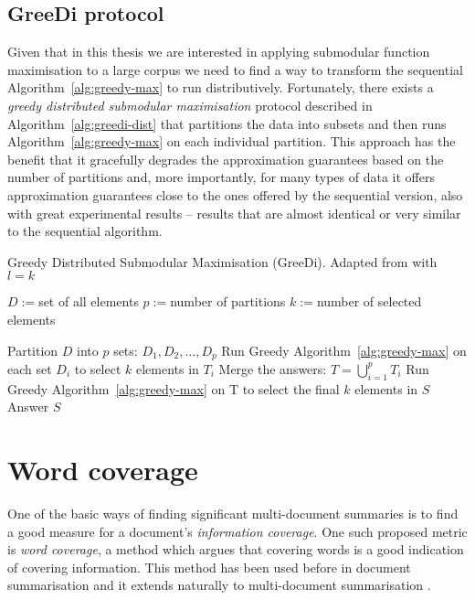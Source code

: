 \subsection{GreeDi protocol}
Given that in this thesis we are interested in applying submodular function
maximisation to a large corpus we need to find a way to transform the
sequential Algorithm~\ref{alg:greedy-max} to run distributively. Fortunately,
there exists a \emph{greedy distributed submodular maximisation} protocol
described in Algorithm~\ref{alg:greedi-dist} that partitions the data into
subsets and then runs Algorithm~\ref{alg:greedy-max} on each individual
partition. This approach has the benefit that it gracefully degrades the
approximation guarantees based on the number of partitions and, more
importantly, for many types of data it offers approximation guarantees close to
the ones offered by the sequential version, also with great experimental
results \cite{mirzasoleiman2013distributed} -- results that are almost identical or very
similar to the sequential algorithm.
\begin{algorithm}
  \caption{Greedy Distributed Submodular Maximisation (GreeDi).
      Adapted from \cite{mirzasoleiman2013distributed} with \(l = k\)}
  \label{alg:greedi-dist}
  \begin{algorithmic}
    \STATE \(D := \)set of all elements
    \STATE \(p := \)number of partitions
    \STATE \(k := \)number of selected elements
  \end{algorithmic}
  \begin{algorithmic}[1]
    \STATE Partition \(D\) into \(p\) sets: \(D_1, D_2, \ldots, D_p\)
    \STATE Run Greedy Algorithm~\ref{alg:greedy-max} on each set \(D_i\) to
        select \(k\) elements in \(T_i\)
    \STATE Merge the answers: \(T = \bigcup_{i=1}^p T_i\)
    \STATE Run Greedy Algorithm~\ref{alg:greedy-max} on T to select the final
        \(k\) elements in \(S\)
    \STATE Answer \(S\)
  \end{algorithmic}
\end{algorithm}

\section{Word coverage}
\label{sec:word-coverage}

One of the basic ways of finding significant multi-document summaries is to
find a good measure for a document's \emph{information coverage}. One such
proposed metric is \emph{word coverage}, a method which argues that covering
words is a good indication of covering information. This method has been used
before in document summarisation and it extends naturally to multi-document
summarisation \cite{sipos2012temporal}.

